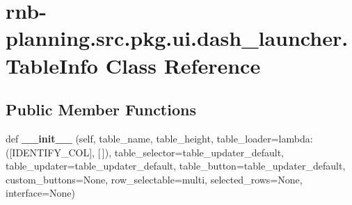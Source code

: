 \hypertarget{classrnb-planning_1_1src_1_1pkg_1_1ui_1_1dash__launcher_1_1_table_info}{}\section{rnb-\/planning.src.\+pkg.\+ui.\+dash\+\_\+launcher.\+Table\+Info Class Reference}
\label{classrnb-planning_1_1src_1_1pkg_1_1ui_1_1dash__launcher_1_1_table_info}
\subsection*{Public Member Functions}
\begin{DoxyCompactItemize}
\item 
\mbox{\label{classrnb-planning_1_1src_1_1pkg_1_1ui_1_1dash__launcher_1_1_table_info_a0c347e93a3894bf0469795fc89bef843}} 
def {\bfseries \+\_\+\+\_\+init\+\_\+\+\_\+} (self, table\+\_\+name, table\+\_\+height, table\+\_\+loader=lambda\+:(\mbox{[}I\+D\+E\+N\+T\+I\+F\+Y\+\_\+\+C\+OL\mbox{]}, \mbox{[}$\,$\mbox{]}), table\+\_\+selector=table\+\_\+updater\+\_\+default, table\+\_\+updater=table\+\_\+updater\+\_\+default, table\+\_\+button=table\+\_\+updater\+\_\+default, custom\+\_\+buttons=None, row\+\_\+selectable=\textquotesingle{}multi\textquotesingle{}, selected\+\_\+rows=None, interface=None)
\end{DoxyCompactItemize}

